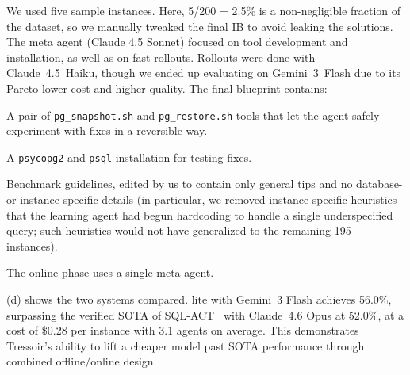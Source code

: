 We used five sample instances. Here, 5/200 = 2.5\% is a non-negligible fraction of the dataset, so we manually tweaked the final IB to avoid leaking the solutions. The meta agent (Claude 4.5 Sonnet) focused on tool development and installation, as well as on fast rollouts. Rollouts were done with Claude~4.5~Haiku, though we ended up evaluating on Gemini~3~Flash due to its Pareto-lower cost and higher quality.
The final blueprint contains:
\squishlist
\item A pair of \texttt{pg\_snapshot.sh} and \texttt{pg\_restore.sh} tools that let the agent safely experiment with fixes in a reversible way.
\item A \texttt{psycopg2} and \texttt{psql} installation for testing fixes.
\item Benchmark guidelines, edited by us to contain only general tips and no database- or instance-specific details (in particular, we removed instance-specific heuristics that the learning agent had begun hardcoding to handle a single underspecified query; such heuristics would not have generalized to the remaining 195 instances).
\squishend

The online phase uses a single meta agent.

(d) shows the two systems compared. \sysname lite with Gemini~3 Flash achieves 56.0\%, surpassing the verified SOTA of SQL-ACT~\cite{birdcritic2025} with Claude~4.6 Opus at 52.0\%, at a cost of \$0.28 per instance with 3.1 agents on average. This demonstrates Tressoir's ability to lift a cheaper model past SOTA performance through combined offline/online design.
